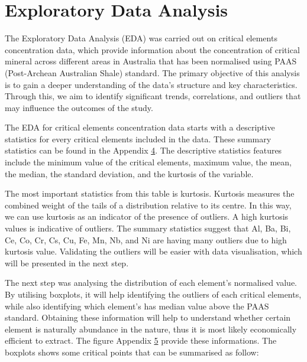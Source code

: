 \documentclass[11pt,a4paper,]{article}
\begin{document}
\section{Exploratory Data Analysis}\label{exploratory-data-analysis}

The Exploratory Data Analysis (EDA) was carried out on critical elements concentration data, which provide information about the concentration of critical mineral across different areas in Australia that has been normalised using PAAS (Post-Archean Australian Shale) standard. The primary objective of this analysis is to gain a deeper understanding of the data's structure and key characteristics. Through this, we aim to identify significant trends, correlations, and outliers that may influence the outcomes of the study.

The EDA for critical elements concentration data starts with a descriptive statistics for every critical elements included in the data. These summary statistics can be found in the Appendix \href{\%7B\#appendix-four\%7D}{4}. The descriptive statistics features include the minimum value of the critical elements, maximum value, the mean, the median, the standard deviation, and the kurtosis of the variable.

The most important statistics from this table is kurtosis. Kurtosis measures the combined weight of the tails of a distribution relative to its centre. In this way, we can use kurtosis as an indicator of the presence of outliers. A high kurtosis values is indicative of outliers. The summary statistics suggest that Al, Ba, Bi, Ce, Co, Cr, Cs, Cu, Fe, Mn, Nb, and Ni are having many outliers due to high kurtosis value. Validating the outliers will be easier with data visualisation, which will be presented in the next step.

The next step was analysing the distribution of each element's normalised value. By utilising boxplots, it will help identifying the outliers of each critical elements, while also identifying which element's has median value above the PAAS standard. Obtaining these information will help to understand whether certain element is naturally abundance in the nature, thus it is most likely economically efficient to extract. The figure Appendix \href{\%7B\#appendix-five\%7D}{5} provide these informations. The boxplots shows some critical points that can be summarised as follow:
\end{document}
